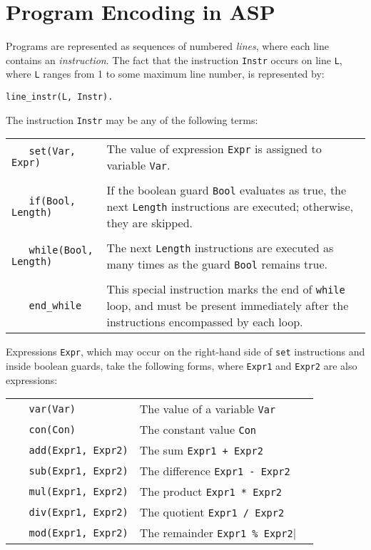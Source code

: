 \documentclass[a4paper,twoside,notitlepage]{report}
\begin{document}
\section{Program Encoding in ASP} \label{sec:progenc}

Programs are represented as sequences of numbered \emph{lines}, where each 
line contains an \emph{instruction}. The fact that the instruction 
\verb|Instr| occurs on line \verb|L|, where \verb|L| ranges from 1 to some 
maximum line number, is represented by:
\begin{Verbatim}[samepage=true]
    line_instr(L, Instr).
\end{Verbatim}

The instruction \verb|Instr| may be any of the following terms:

\begin{tabularx}{\textwidth}{lX}
    \verb|   set(Var, Expr)|
&   The value of expression \verb|Expr| is assigned to variable \verb|Var|.
\\
\\  \verb|   if(Bool, Length)|
&   If the boolean guard \verb|Bool| evaluates as true, the next \verb|Length|
    instructions are executed; otherwise, they are skipped.
\\
\\  \verb|   while(Bool, Length)|
&   The next \verb|Length| instructions are executed as many times as the 
    guard \verb|Bool| remains true.
\\
\\  \verb|   end_while|
&   This special instruction marks the end of \verb|while| loop, and must 
    be present immediately after the instructions encompassed by each loop.
\end{tabularx}

Expressions \verb|Expr|, which may occur on the right-hand side of 
\verb|set| instructions and inside boolean guards, take the following 
forms, where \verb|Expr1| and \verb|Expr2| are also expressions:

\begin{tabular}{lll}
    \verb|   var(Var)|          & The value of a variable \verb|Var|
\\  \verb|   con(Con)|          & The constant value \verb|Con|
\\  \verb|   add(Expr1, Expr2)| & The sum \verb|Expr1 + Expr2|
\\  \verb|   sub(Expr1, Expr2)| & The difference \verb|Expr1 - Expr2|
\\  \verb|   mul(Expr1, Expr2)| & The product \verb|Expr1 * Expr2|
\\  \verb|   div(Expr1, Expr2)| & The quotient \verb|Expr1 / Expr2|
\\  \verb|   mod(Expr1, Expr2)| & The remainder \verb|Expr1 % Expr2|
\end{tabular}
\end{document}
